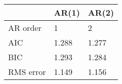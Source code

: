 \begin{tabular}{lll}
\toprule
{} &  AR(1) &  AR(2) \\
\midrule
AR order  &      1 &      2 \\
AIC       &  1.288 &  1.277 \\
BIC       &  1.293 &  1.284 \\
RMS error &  1.149 &  1.156 \\
\bottomrule
\end{tabular}
